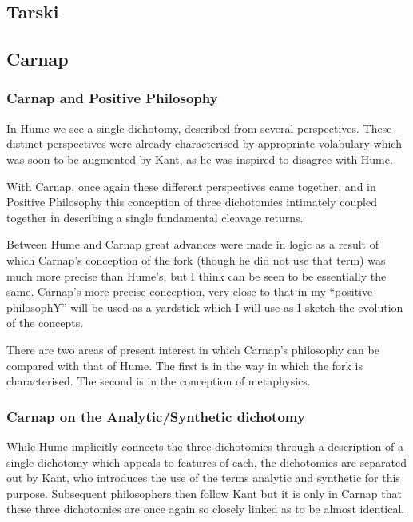 \subsection{Tarski}

\subsection{Carnap}

\subsubsection{Carnap and Positive Philosophy}

In Hume we see a single dichotomy, described from several
perspectives.
These distinct perspectives were already characterised by appropriate
volabulary which was soon to be augmented by Kant, as he was inspired
to disagree with Hume.

With Carnap, once again these different perspectives came together,
and in Positive Philosophy this conception of three dichotomies
intimately coupled together in describing a single fundamental
cleavage returns.

Between Hume and Carnap great advances were made in logic as a result
of which Carnap's conception of the fork (though he did not use that
term) was much more precise than Hume's, but I think can be seen to be
essentially the same.
Carnap's more precise conception, very close to that in my ``positive
philosophY'' will be used as a yardstick which I will use as I sketch
the evolution of the concepts.

There are two areas of present interest in which Carnap's philosophy
can be compared with that of Hume.
The first is in the way in which the fork is characterised.
The second is in the conception of metaphysics.

\subsubsection{Carnap on the Analytic/Synthetic dichotomy}

While Hume implicitly connects the three dichotomies through a
description of a single dichotomy which appeals to features of each,
the dichotomies are separated out by Kant, who introduces the
use of the terms analytic and synthetic for this purpose.
Subsequent philosophers then follow Kant but it is only in Carnap that
these three dichotomies are once again so closely linked as to be
almost identical.

